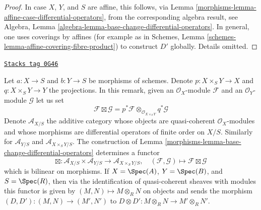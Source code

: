 \begin{proof}

In case $X$, $Y$, and $S$ are affine, this follows, via
Lemma \ref{morphisms-lemma-affine-case-differential-operators},
from the corresponding algebra result, see
Algebra, Lemma \ref{algebra-lemma-base-change-differential-operators}.
In general, one uses coverings by affines
(for example as in Schemes, Lemma
\ref{schemes-lemma-affine-covering-fibre-product})
to construct $D'$ globally. Details omitted.
\end{proof}

\begin{remark}
\label{morphisms-remark-base-change-differential-operators}
\href{https://stacks.math.columbia.edu/tag/0G46}{\texttt{Stacks tag 0G46}}

Let $a : X \to S$ and $b : Y \to S$ be morphisms of schemes.
Denote $p : X \times_S Y \to X$ and $q : X \times_S Y \to Y$ the
projections. In this remark, given an $\mathcal{O}_X$-module $\mathcal{F}$
and an $\mathcal{O}_Y$-module $\mathcal{G}$ let us set
$$
\mathcal{F} \boxtimes \mathcal{G} =
p^*\mathcal{F} \otimes_{\mathcal{O}_{X \times_S Y}} q^*\mathcal{G}
$$
Denote $\mathcal{A}_{X/S}$ the additive category
whose objects are quasi-coherent $\mathcal{O}_X$-modules and
whose morphisms are differential operators of finite order on $X/S$.
Similarly for $\mathcal{A}_{Y/S}$ and $\mathcal{A}_{X \times_S Y/S}$.
The construction of Lemma \ref{morphisms-lemma-base-change-differential-operators}
determines a functor
$$
\boxtimes :
\mathcal{A}_{X/S} \times \mathcal{A}_{Y/S} \longrightarrow
\mathcal{A}_{X \times_S Y/S},
\quad
(\mathcal{F}, \mathcal{G}) \longmapsto \mathcal{F} \boxtimes \mathcal{G}
$$
which is bilinear on morphisms. If $X = \Spec(A)$, $Y = \Spec(B)$, and
$S = \Spec(R)$, then via the identification of quasi-coherent sheaves
with modules this functor is given by $(M, N) \mapsto M \otimes_R N$
on objects and sends the morphism $(D, D') : (M, N) \to (M', N')$ to
$D \otimes D' : M \otimes_R N \to M' \otimes_R N'$.
\end{remark}

